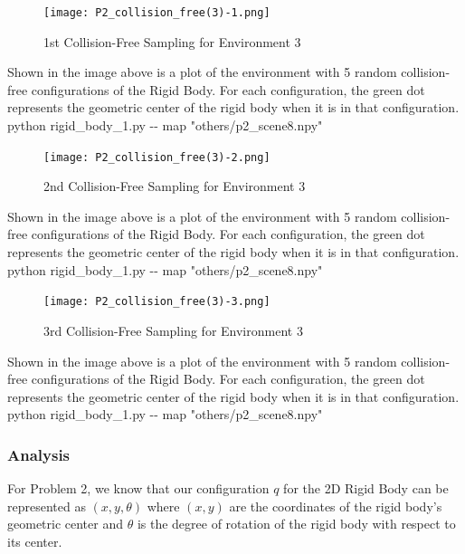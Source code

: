 \documentclass{article}
\begin{document}
\newpage 
\begin{figure}[h!]
	\texttt{[image: P2\_collision\_free(3)-1.png]}
	\centering
	\caption{1st Collision-Free Sampling for Environment 3}
	\label{P2_collision_free(3)-1.png}
\end{figure}
Shown in the image above is a plot of the environment with 5 random collision-free configurations of the Rigid Body. For each configuration, the green dot represents the geometric center of the rigid body when it is in that configuration. 
python rigid\_body\_1.py -\-- map "others/p2\_scene8.npy"

\newpage 
\begin{figure}[h!]
	\texttt{[image: P2\_collision\_free(3)-2.png]}
	\centering
	\caption{2nd Collision-Free Sampling for Environment 3}
	\label{P2_collision_free(3)-2.png}
\end{figure}
Shown in the image above is a plot of the environment with 5 random collision-free configurations of the Rigid Body. For each configuration, the green dot represents the geometric center of the rigid body when it is in that configuration. 
python rigid\_body\_1.py -\-- map "others/p2\_scene8.npy"

\newpage 
\begin{figure}[h!]
	\texttt{[image: P2\_collision\_free(3)-3.png]}
	\centering
	\caption{3rd Collision-Free Sampling for Environment 3}
	\label{P2_collision_free(3)-3.png}
\end{figure}
Shown in the image above is a plot of the environment with 5 random collision-free configurations of the Rigid Body. For each configuration, the green dot represents the geometric center of the rigid body when it is in that configuration. 
python rigid\_body\_1.py -\-- map "others/p2\_scene8.npy"


\newpage 
\subsubsection{Analysis}
For Problem 2, we know that our configuration $q$ for the 2D Rigid Body can be represented as $(x, y, \theta)$ where $(x, y)$ are the coordinates of the rigid body's geometric center and $\theta$ is the degree of rotation of the rigid body with respect to its center. 
\end{document}
